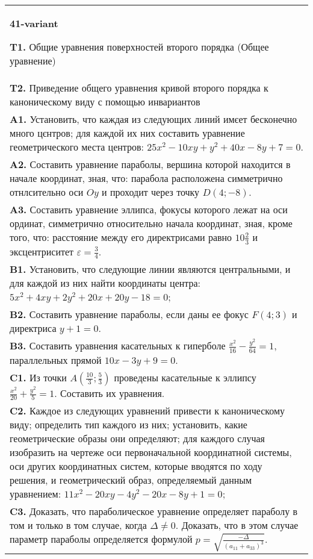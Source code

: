 \documentclass{article}
\begin{document}
\begin{tabular}{m{17cm}}
\textbf{41-variant}
\newline

\textbf{T1.} Общие уравнения поверхностей второго порядка (Общее уравнение) \\
\textbf{T2.} Приведение общего уравнения кривой второго порядка к каноническому виду с помощью инвариантов \\
\textbf{A1.} Установить, что каждая из следующих линий имєет бесконечно много цєнтров; для каждой их них составить уравнение геометрического места центров: $25 x^2-10 x y+y^2+40 x-8 y+7=0$. \\
\textbf{A2.} Составить уравнение параболы, вершина которой находится в начале координат, зная, что: парабола расположена симметрично отнлсительно оси $O y$ и проходит через точку $D(4 ;-8)$. \\
\textbf{A3.} Составить уравнение эллипса, фокусы которого лежат на оси ординат, симметрично относительно начала координат, зная, кроме того, что: расстояние между его директрисами равно $10 \frac{2}{3}$ и эксцентриситет $\varepsilon=\frac{3}{4}$. \\
\textbf{B1.} Установить, что следующие линии являются центральными, и для каждой из них найти координаты центра: $5 x^2+4 x y+2 y^2+20 x+20 y-18=0$; \\
\textbf{B2.} Составить уравнение параболы, если даны ее фокус $F(4 ; 3)$ и директриса $y+1=0$. \\
\textbf{B3.} Составить уравнения касательных к гиперболе $\frac{x^2}{16}-\frac{y^2}{64}=1$, параллельных прямой $10 x-3 y+9=0$. \\
\textbf{C1.} Из точки $A\left(\frac{10}{3} ; \frac{5}{3}\right)$ проведены касательные к эллипсу $\frac{x^2}{20}+\frac{y^2}{5}=1$. Составить их уравнения. \\
\textbf{C2.} Каждое из следующих уравнений привести к каноническому виду; определить тип каждого из них; установить, какие геометрические образы они определяют; для каждого случая изобразить на чертеже оси первоначальной координатной системы, оси других координатных систем, которые вводятся по ходу решения, и геометрический образ, определяемый данным уравнением: $11 x^2-20 x y-4 y^2-20 x-8 y+1=0$; \\
\textbf{C3.} Доказать, что параболическое уравнение определяет параболу в том и только в том случае, когда $\Delta \neq 0$. Доказать, что в этом случае параметр параболы определяется формулой $p=\sqrt{\frac{-\Delta}{ (a_{11}+a_{33}) ^3}}$. \\

\end{tabular}
\vspace{1cm}
\end{document}
